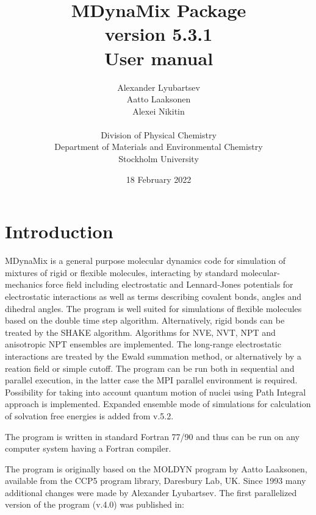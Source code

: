 \documentclass{article}
\begin{document}
\title{MDynaMix Package\\
version 5.3.1\\
User manual}

\author{Alexander Lyubartsev\\
  Aatto Laaksonen \\
  Alexei Nikitin \\
  \\
  Division of Physical Chemistry\\
  Department of Materials and Environmental Chemistry \\
Stockholm University
}

\date{18 February 2022}

\maketitle


\newpage
\tableofcontents

\newpage
\section{Introduction}

MDynaMix is a general purpose molecular dynamics code for simulation of mixtures  of rigid or flexible molecules, interacting by standard 
molecular-mechanics force field including electrostatic and Lennard-Jones
potentials for electrostatic interactions as well as terms describing 
covalent bonds, angles and dihedral angles. The program is well suited for
simulations of flexible molecules based on the double time step algorithm.
Alternatively, rigid bonds can be treated by the SHAKE algorithm.
Algorithms for NVE, NVT, NPT and anisotropic NPT ensembles are implemented.
The long-range electrostatic interactions are treated by the Ewald 
summation method, or alternatively by a reation field or simple cutoff. 
The program can be run both in sequential and parallel execution, in
the latter case the MPI parallel environment is required. 
Possibility for taking into account quantum motion of nuclei using 
Path Integral approach is implemented. Expanded ensemble mode
of simulations for calculation of solvation free energies is added from v.5.2. 

The program is written in standard Fortran 77/90 and thus can be run on 
any computer system having a Fortran compiler.
                    
The program is originally based on the MOLDYN program by Aatto Laaksonen,
available from the CCP5 program library, Daresbury Lab, UK. Since 1993 
many additional changes were made by Alexander Lyubartsev. The first
parallelized version of the program (v.4.0) was published in:
\end{document}
